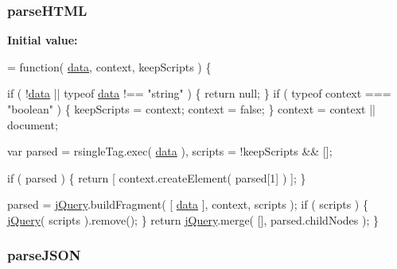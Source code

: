 \subsubsection[{parse\+H\+T\+M\+L}]{ parse\+H\+T\+M\+L}\label{jquery-1_810_82-vsdoc_8js_a09aeded1ab567632f194acd1550eac88}
{\bfseries Initial value\+:}
\begin{DoxyCode}
= \textcolor{keyword}{function}( \hyperlink{jquery-1_810_82-vsdoc_8js_a609407b3456fdc3c5671a9fc4a226ff7}{data}, context, keepScripts ) \{

        \textcolor{keywordflow}{if} ( !\hyperlink{jquery-1_810_82-vsdoc_8js_a609407b3456fdc3c5671a9fc4a226ff7}{data} || typeof \hyperlink{jquery-1_810_82-vsdoc_8js_a609407b3456fdc3c5671a9fc4a226ff7}{data} !== \textcolor{stringliteral}{"string"} ) \{
            \textcolor{keywordflow}{return} null;
        \}
        \textcolor{keywordflow}{if} ( typeof context === \textcolor{stringliteral}{"boolean"} ) \{
            keepScripts = context;
            context = \textcolor{keyword}{false};
        \}
        context = context || document;

        var parsed = rsingleTag.exec( \hyperlink{jquery-1_810_82-vsdoc_8js_a609407b3456fdc3c5671a9fc4a226ff7}{data} ),
            scripts = !keepScripts && [];

        
        \textcolor{keywordflow}{if} ( parsed ) \{
            \textcolor{keywordflow}{return} [ context.createElement( parsed[1] ) ];
        \}

        parsed = \hyperlink{jquery-1_810_82-vsdoc_8js_add5237586d970a38a81f990e8eb28c6c}{jQuery}.buildFragment( [ \hyperlink{jquery-1_810_82-vsdoc_8js_a609407b3456fdc3c5671a9fc4a226ff7}{data} ], context, scripts );
        \textcolor{keywordflow}{if} ( scripts ) \{
            \hyperlink{jquery-1_810_82-vsdoc_8js_add5237586d970a38a81f990e8eb28c6c}{jQuery}( scripts ).remove();
        \}
        \textcolor{keywordflow}{return} \hyperlink{jquery-1_810_82-vsdoc_8js_add5237586d970a38a81f990e8eb28c6c}{jQuery}.merge( [], parsed.childNodes );
    \}
\end{DoxyCode}
\hypertarget{jquery-1_810_82-vsdoc_8js_a04f5ac130281955d6ed88ad6456a4e15}{}
\subsubsection[{parse\+J\+S\+O\+N}]{ parse\+J\+S\+O\+N}\label{jquery-1_810_82-vsdoc_8js_a04f5ac130281955d6ed88ad6456a4e15}
\hypertarget{jquery-1_810_82-vsdoc_8js_ab58e01f0a789f6062d3b05417f56140e}{}
